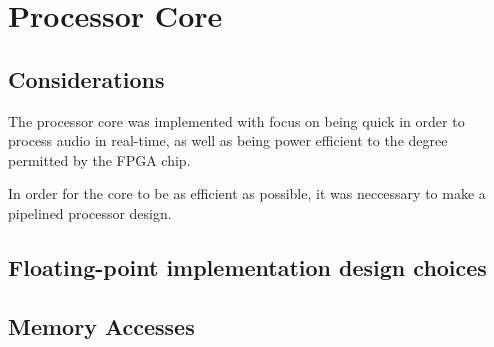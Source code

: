 \FloatBarrier
\section{Processor Core}\label{section:fpga-processor-core}

\subsection{Considerations}

The processor core was implemented with focus on being quick
in order to process audio in real-time, as well as being power
efficient to the degree permitted by the FPGA chip.

In order for the core to be as efficient as possible, it was
neccessary to make a pipelined processor design.

\subsection{Floating-point implementation design choices}

\subsection{Memory Accesses}

